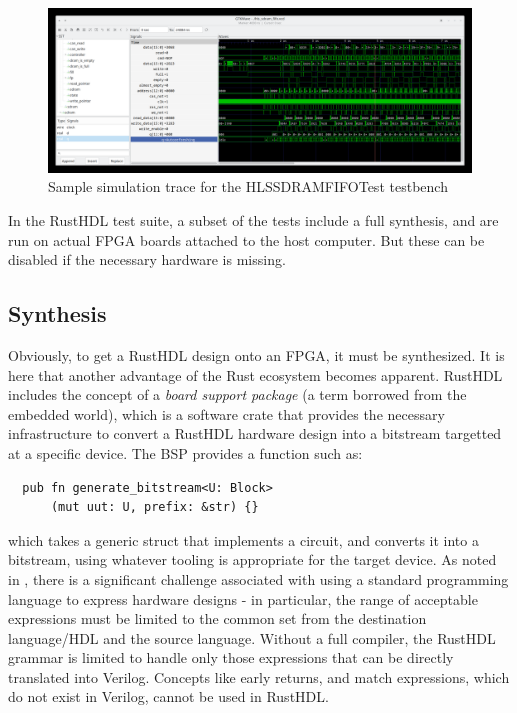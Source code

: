 \documentclass[conference]{IEEEtran}
\begin{document}
\begin{figure}[htbp]
  \centerline{\includegraphics[width=18cm]{hls_sdram_fifo.png}}
  \caption{Sample simulation trace for the \textrm{HLSSDRAMFIFOTest} testbench}
  \label{fig:trace}
\end{figure}
  
In the RustHDL test suite, a subset of the tests include a full synthesis, and are run on
actual FPGA boards attached to the host computer.  But these can be disabled if the necessary 
hardware is missing.

\subsection{Synthesis}

Obviously, to get a RustHDL design onto an FPGA, it must be synthesized.  It is here that another 
advantage of the Rust ecosystem becomes apparent.  RustHDL includes the concept of a \emph{board support package} 
(a term borrowed from the embedded world), which is a software crate that provides the necessary infrastructure to
convert a RustHDL hardware design into a bitstream targetted at a specific device.  The BSP provides a function such 
as:

\begin{verbatim}
  pub fn generate_bitstream<U: Block>
      (mut uut: U, prefix: &str) {}
\end{verbatim}

which takes a generic struct that implements a circuit, and converts it into a bitstream, using whatever tooling is
appropriate for the target device.  As noted in \cite{b1}, there is a significant challenge associated with using 
a standard programming language to express hardware designs - in particular, the range of acceptable expressions
must be limited to the common set from the destination language/HDL and the source language.  Without a full compiler,
the RustHDL grammar is limited to handle only those expressions that can be directly translated into Verilog.  
Concepts like early returns, and match expressions, which do not exist in Verilog, cannot be used in RustHDL.  
\end{document}
